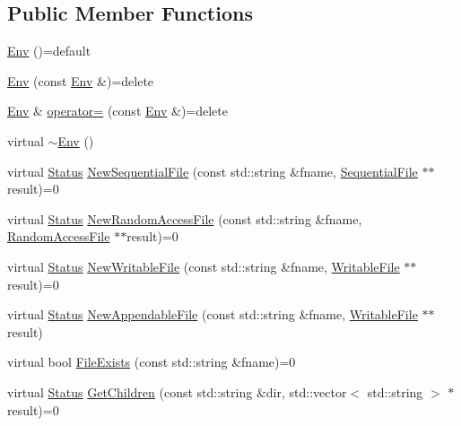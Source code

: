 \subsection*{Public Member Functions}
\begin{DoxyCompactItemize}
\item 
\mbox{\hyperlink{classleveldb_1_1_env_a35c9ebc8e8105588d95343c69834827e}{Env}} ()=default
\item 
\mbox{\hyperlink{classleveldb_1_1_env_a44fbfd1f9fc297611ede34c4c9e035e7}{Env}} (const \mbox{\hyperlink{classleveldb_1_1_env}{Env}} \&)=delete
\item 
\mbox{\hyperlink{classleveldb_1_1_env}{Env}} \& \mbox{\hyperlink{classleveldb_1_1_env_a9f5edd8301a1a50a41483af37f66b664}{operator=}} (const \mbox{\hyperlink{classleveldb_1_1_env}{Env}} \&)=delete
\item 
virtual \mbox{\hyperlink{classleveldb_1_1_env_aeab8b8a19cd38effb685323d1ae7d4d5}{$\sim$\+Env}} ()
\item 
virtual \mbox{\hyperlink{classleveldb_1_1_status}{Status}} \mbox{\hyperlink{classleveldb_1_1_env_ad73810059f48c1d7b91125d357e7d351}{New\+Sequential\+File}} (const std\+::string \&fname, \mbox{\hyperlink{classleveldb_1_1_sequential_file}{Sequential\+File}} $\ast$$\ast$result)=0
\item 
virtual \mbox{\hyperlink{classleveldb_1_1_status}{Status}} \mbox{\hyperlink{classleveldb_1_1_env_a1df3e0bb2d47ee914448df9bb9ca0734}{New\+Random\+Access\+File}} (const std\+::string \&fname, \mbox{\hyperlink{classleveldb_1_1_random_access_file}{Random\+Access\+File}} $\ast$$\ast$result)=0
\item 
virtual \mbox{\hyperlink{classleveldb_1_1_status}{Status}} \mbox{\hyperlink{classleveldb_1_1_env_a4566194f3e82fede425fdb5bb355f7de}{New\+Writable\+File}} (const std\+::string \&fname, \mbox{\hyperlink{classleveldb_1_1_writable_file}{Writable\+File}} $\ast$$\ast$result)=0
\item 
virtual \mbox{\hyperlink{classleveldb_1_1_status}{Status}} \mbox{\hyperlink{classleveldb_1_1_env_a77886b6f8f8b5df8e40057be234a3b5d}{New\+Appendable\+File}} (const std\+::string \&fname, \mbox{\hyperlink{classleveldb_1_1_writable_file}{Writable\+File}} $\ast$$\ast$result)
\item 
virtual bool \mbox{\hyperlink{classleveldb_1_1_env_acbb85047fdf7bf441bd365cfb09f9ecb}{File\+Exists}} (const std\+::string \&fname)=0
\item 
virtual \mbox{\hyperlink{classleveldb_1_1_status}{Status}} \mbox{\hyperlink{classleveldb_1_1_env_a53028e3112d7bb3bf6574ddaab18d6f6}{Get\+Children}} (const std\+::string \&dir, std\+::vector$<$ std\+::string $>$ $\ast$result)=0

\end{DoxyCompactItemize}
